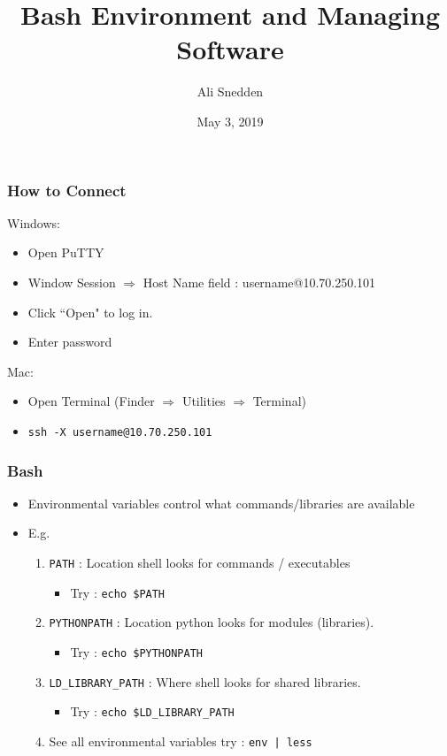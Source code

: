 \documentclass{beamer}
\title{Bash Environment and Managing Software}
\author{Ali Snedden}
\institute{Nationwide Children's Hospital}
\date{May 3, 2019}
\newcommand{\code}[1]{\colorbox{codegray}{\texttt{#1}}}
\begin{document}
 
\frame{\titlepage}




\begin{frame}
\frametitle{How to Connect}
Windows:
\begin{itemize}
    \item Open PuTTY
    \item Window Session $\Rightarrow$ Host Name field : username@10.70.250.101
    \item Click ``Open" to log in.
    \item Enter password
\end{itemize}

Mac:
\begin{itemize}
    \item Open Terminal (Finder $\Rightarrow$ Utilities $\Rightarrow$ Terminal)
    \item \code{ssh -X username@10.70.250.101}
\end{itemize}
\end{frame}



\begin{frame}
\frametitle{Bash}
\begin{itemize}
    \item Environmental variables control what commands/libraries are available
    \pause
    \item E.g.
    \pause
    \begin{enumerate}
        \item \code{PATH} : Location shell looks for commands / executables
            \begin{itemize}
                \item Try : \code{echo \$PATH}
            \end{itemize}
        \pause
        \bigskip
        \item \code{PYTHONPATH} : Location python looks for modules (libraries).
            \begin{itemize}
                \item Try : \code{echo \$PYTHONPATH}
            \end{itemize}
        \bigskip
        \item \code{LD\_LIBRARY\_PATH} : Where shell looks for shared libraries.
            \begin{itemize}
                \item Try : \code{echo \$LD\_LIBRARY\_PATH}
            \end{itemize}
        \pause
    \pause
    \bigskip
    \item See all environmental variables try : \code{env | less}
    \end{enumerate}
\end{itemize}
\end{frame}
\end{document}
